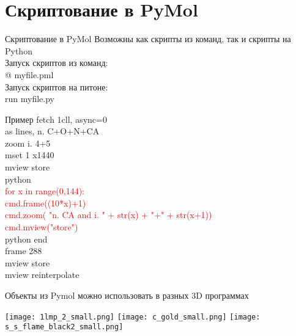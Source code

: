	\section{Скриптование в PyMol}

	\begin{frame}{Скриптование в PyMol}
			Возможны как скрипты из команд, так и скрипты на Python \\
			Запуск скриптов из команд:\\
			\textcolor{blue!40!white}{@ myfile.pml}\\
			Запуск скриптов на питоне:\\
			\textcolor{blue!40!white}{run myfile.py}
	\end{frame}

	\begin{frame}{Пример}
			\small
			\textcolor{blue!40!white}{
			fetch 1cll, async=0\\
			as lines, n. C+O+N+CA\\
			zoom i. 4+5\\
			mset 1 x1440\\
		    mview store\\
	        python}\\
			\textcolor{red}{for x in range(0,144):\\
				\hspace{0.5cm}  cmd.frame((10*x)+1)\\
			    \hspace{0.5cm}  cmd.zoom( "n. CA and i. " + str(x) + "+" + str(x+1))\\
			    \hspace{0.5cm}  cmd.mview("store")\\}
			\textcolor{blue!40!white}{
			python end\\
			frame 288\\
			mview store\\
		mview reinterpolate}\\
	\end{frame}

    \begin{frame}[plain]
    \end{frame}



    
	  \begin{frame}{Объекты из Pymol можно использовать в разных 3D программах}
		  \begin{center}
			\texttt{[image: 1lmp\_2\_small.png]} 
			\texttt{[image: c\_gold\_small.png]} 
			\texttt{[image: s\_s\_flame\_black2\_small.png]}
		\end{center}
		\end{frame}

